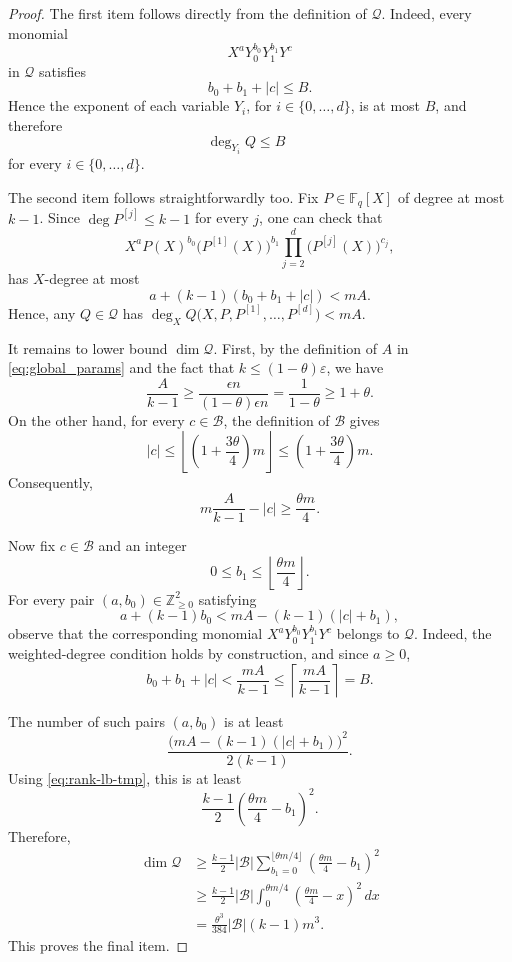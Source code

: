 \documentclass[10pt,a4paper]{amsart}
\newcommand{\eps}{\varepsilon}
\begin{document}
\begin{proof}
The first item follows directly from the definition of $\mathcal Q$.
Indeed, every monomial
\[
X^aY_0^{b_0}Y_1^{b_1}Y^c
\]
in $\mathcal Q$ satisfies
\[
b_0+b_1+|c|\le B.
\]
Hence the exponent of each variable $Y_i$, for $i\in\{0,\ldots,d\}$, is at
most $B$, and therefore
\[
\deg_{Y_i}Q\le B
\qquad
\]
for every $i \in \{0,\ldots, d\}$.

The second item follows straightforwardly too. Fix $P\in\mathbb F_q[X]$ of degree at most $k-1$. Since $\deg P^{[j]}\le k-1$
for every $j$, one can check that
\[
X^a
P(X)^{b_0}
\bigl(P^{[1]}(X)\bigr)^{b_1}
\prod_{j=2}^{d}
\bigl(P^{[j]}(X)\bigr)^{c_j},
\]
has $X$-degree at most
\[
a+(k-1)(b_0+b_1+|c|)<mA.
\]
Hence, any $Q \in \mathcal{Q}$ has $\deg_X
Q\bigl(X,P,P^{[1]},\ldots,P^{[d]}\bigr)
<mA$.

It remains to lower bound $\dim\mathcal Q$. First, by the definition of $A$ in \eqref{eq:global_params} and the fact that $k \leq (1-\theta) \eps$, we have
\[
\frac{A}{k-1}
\ge
\frac{\epsilon n}{(1-\theta)\epsilon n}
=
\frac{1}{1-\theta}
\ge
1+\theta.
\]
On the other hand, for every $c\in\mathcal B$, the definition of
$\mathcal B$ gives
\[
|c|
\le
\left\lfloor
\left(1+\frac{3\theta}{4}\right)m
\right\rfloor
\le
\left(1+\frac{3\theta}{4}\right)m.
\]
Consequently,
\begin{equation}\label{eq:rank-lb-tmp}
m\frac{A}{k-1}-|c|
\ge
\frac{\theta m}{4}.
\end{equation}

Now fix $c\in\mathcal B$ and an integer
\[
0\le b_1\le
\left\lfloor\frac{\theta m}{4}\right\rfloor.
\]
For every pair $(a,b_0)\in\mathbb Z_{\ge0}^2$ satisfying
\[
a+(k-1)b_0
<
mA-(k-1)(|c|+b_1),
\]
observe that the corresponding monomial $X^aY_0^{b_0}Y_1^{b_1}Y^c$
belongs to $\mathcal Q$. Indeed, the weighted-degree condition holds by
construction, and since $a\ge0$,
\[
b_0+b_1+|c|
<
\frac{mA}{k-1}
\le
\left\lceil\frac{mA}{k-1}\right\rceil
=
B.
\]

The number of such pairs $(a,b_0)$ is at least
\[
\frac{
\bigl(mA-(k-1)(|c|+b_1)\bigr)^2
}{
2(k-1)
}.
\]
Using \eqref{eq:rank-lb-tmp}, this is at least
\[
\frac{k-1}{2}
\left(
\frac{\theta m}{4}-b_1
\right)^2.
\]
Therefore,
\[
\begin{aligned}
\dim\mathcal Q
&\ge
\frac{k-1}{2}
|\mathcal B|
\sum_{b_1=0}^{\lfloor\theta m/4\rfloor}
\left(
\frac{\theta m}{4}-b_1
\right)^2\\
&\ge
\frac{k-1}{2}
|\mathcal B|
\int_0^{\theta m/4}
\left(
\frac{\theta m}{4}-x
\right)^2\,dx\\
&=
\frac{\theta^3}{384}
|\mathcal B|(k-1)m^3.
\end{aligned}
\]
This proves the final item.
\end{proof}
\end{document}

